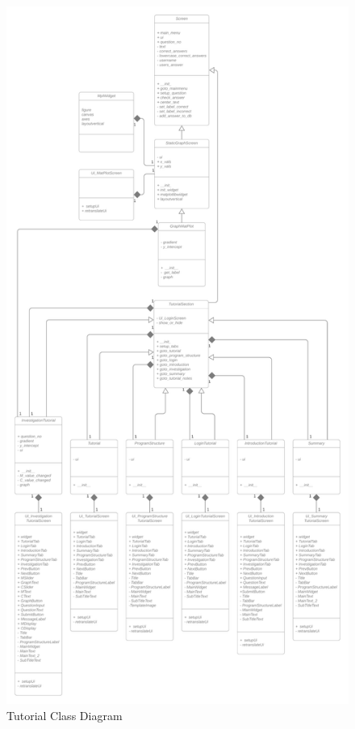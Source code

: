 \documentclass{article}
\begin{document}
\begin{figure}[h]
    \centering
    \captionsetup{justification=centering}
    \includegraphics[scale=0.08]{tutorial-class-diagram}
    \caption{Tutorial Class Diagram}
\end{figure}
\end{document}
